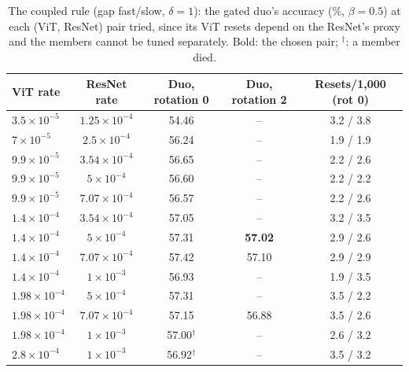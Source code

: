 \begin{table}[t]
  \centering\small
  \begin{tabular}{@{}lcccc@{}}
    \toprule
    ViT rate & ResNet rate & Duo, rotation 0 & Duo, rotation 2 & Resets/1,000 (rot 0) \\
    \midrule
    $3.5\!\times\!10^{-5}$ & $1.25\!\times\!10^{-4}$ & 54.46 & -- & 3.2 / 3.8 \\
    $7\!\times\!10^{-5}$ & $2.5\!\times\!10^{-4}$ & 56.24 & -- & 1.9 / 1.9 \\
    $9.9\!\times\!10^{-5}$ & $3.54\!\times\!10^{-4}$ & 56.65 & -- & 2.2 / 2.6 \\
    $9.9\!\times\!10^{-5}$ & $5\!\times\!10^{-4}$ & 56.60 & -- & 2.2 / 2.2 \\
    $9.9\!\times\!10^{-5}$ & $7.07\!\times\!10^{-4}$ & 56.57 & -- & 2.2 / 2.6 \\
    $1.4\!\times\!10^{-4}$ & $3.54\!\times\!10^{-4}$ & 57.05 & -- & 3.2 / 3.5 \\
    $1.4\!\times\!10^{-4}$ & $5\!\times\!10^{-4}$ & 57.31 & \textbf{57.02} & 2.9 / 2.6 \\
    $1.4\!\times\!10^{-4}$ & $7.07\!\times\!10^{-4}$ & 57.42 & 57.10 & 2.9 / 2.9 \\
    $1.4\!\times\!10^{-4}$ & $1\!\times\!10^{-3}$ & 56.93 & -- & 1.9 / 3.5 \\
    $1.98\!\times\!10^{-4}$ & $5\!\times\!10^{-4}$ & 57.31 & -- & 3.5 / 2.2 \\
    $1.98\!\times\!10^{-4}$ & $7.07\!\times\!10^{-4}$ & 57.15 & 56.88 & 3.5 / 2.6 \\
    $1.98\!\times\!10^{-4}$ & $1\!\times\!10^{-3}$ & 57.00$^\dagger$ & -- & 2.6 / 3.2 \\
    $2.8\!\times\!10^{-4}$ & $1\!\times\!10^{-3}$ & 56.92$^\dagger$ & -- & 3.5 / 3.2 \\
    \bottomrule
  \end{tabular}
  \caption{The coupled rule (gap fast/slow, $\delta=1$): the gated duo's accuracy (\%, $\beta=0.5$) at each (ViT, ResNet) pair tried, since its ViT resets depend on the ResNet's proxy and the members cannot be tuned separately. Bold: the chosen pair; $^\dagger$: a member died.}
  \label{tab:tune_rates_gap}
\end{table}
